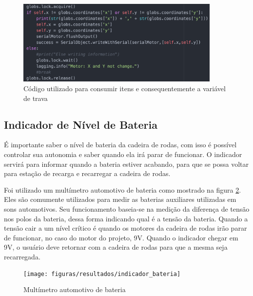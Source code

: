 		\begin{figure}[!htb]
			\centering
			\includegraphics[width=0.9\textwidth]{figuras/resultados/motor_lock}
			\caption{Código utilizado para consumir itens e consequentemente a variável de trava}
			\label{fig:motor_lock}
		\end{figure}

	\subsection{Indicador de Nível de Bateria}

		É importante saber o nível de bateria da cadeira de rodas, com isso é possível controlar sua autonomia e saber quando ela irá parar de funcionar. O indicador servirá para informar quando a bateria estiver acabando, para que se possa voltar para estação de recarga e recarregar a cadeira de rodas.

		Foi utilizado um multímetro automotivo de bateria como mostrado na figura \ref{fig:indicador_bateria}. Eles são comumente utilizados para medir as baterias auxiliares utilizadas em sons automotivos. Seu funcionamento baseia-se na medição da diferença de tensão nos polos da bateria, dessa forma indicando qual é a tensão da bateria. Quando a tensão cair a um nível crítico é quando os motores da cadeira de rodas irão parar de funcionar, no caso do motor do projeto, 9V. Quando o indicador chegar em 9V, o usuário deve retornar com a cadeira de rodas para que a mesma seja recarregada.

		\begin{figure}[!ht]
			\center
			\texttt{[image: figuras/resultados/indicador\_bateria]}
			\caption{Multímetro automotivo de bateria}
			\label{fig:indicador_bateria}
		\end{figure}

